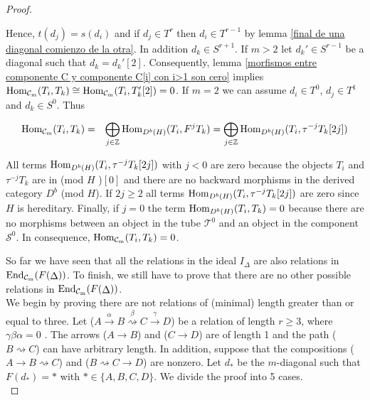 \documentclass{amsart}
\theoremstyle{plain}
\theoremstyle{definition}
\begin{document}
\begin{proof}
\begin{itemize}
      Hence,  $t(d_j)=s(d_i)$ and if $d_j\in T^r$ then $d_i\in T^{r-1}$ by lemma \ref{final de una diagonal comienzo de la otra}. In addition  $d_k\in S^{r+1}$.  If $m>2$ let $d_k'\in S^{r-1}$  be a diagonal such that  $d_k=d_k'[2]$. Consequently, lemma \ref{morfismos entre componente C y componente C[i] con i>1 son cero} implies ${\mathop{\rm Hom_{\mathcal{C}_m}}\nolimits}(T_i,T_k)\cong {\mathop{\rm Hom_{\mathcal{C}_m}}\nolimits}(T_i,T_k'[2])=0$. If $m=2$ we can assume $d_i\in T^0$, $d_j\in T^1$ and $d_k\in S^0$. Thus

      \begin{eqnarray*}
      {\mathop{\rm Hom_{\mathcal{C}_m}}\nolimits}(T_i,T_k) & =  &  \bigoplus_{j\in \mathbb{Z}} {\mathop{\rm Hom}\nolimits}_{D^b(H)}(T_i,F^jT_k)
       =  \bigoplus_{j\in \mathbb{Z}} {\mathop{\rm Hom}\nolimits}_{D^b(H)}(T_i,\tau^{-j}T_k[2j])
      \end{eqnarray*}

  All terms ${\mathop{\rm Hom}\nolimits}_{D^b(H)}(T_i,\tau^{-j}T_k[2j])$ with $j< 0$ are zero because the objects $T_i$ and  $\tau^{-j}T_k$ are in (mod $H$ )$[0]$ and there are no backward morphisms in the derived category $ D^b$ (mod $H$). If $2j\geq2$ all terms ${\mathop{\rm Hom}\nolimits}_{D^b(H)}(T_i,\tau^{-j}T_k[2j])$ are zero since $H$ is hereditary. Finally, if $j=0$ the term ${\mathop{\rm Hom}\nolimits}_{D^b(H)}(T_i,T_k)=0$ because there are no  morphisms between an  object in the tube $\mathcal{T}^0$ and an object in the component  $\mathcal{S}^0$. In consequence,  ${\mathop{\rm Hom_{\mathcal{C}_m}}\nolimits}(T_i,T_k) =0$.\\

\end{itemize}

So far we have seen that all the relations in the ideal  $I_{\Delta}$ are also relations in   ${\mathop{\rm End_{\mathcal{C}_m}}\nolimits}(F({\mathop{\Delta}\nolimits}))$.  To finish,  we still have to prove that there are no  other possible relations in   ${\mathop{\rm End_{\mathcal{C}_m}}\nolimits}(F({\mathop{\Delta}\nolimits}))$. \\

We begin by proving  there are not  relations of (minimal) length  greater than or equal to three. Let ($A\stackrel{\alpha}{\rightarrow} B \stackrel{\beta} {\rightsquigarrow} C\stackrel {\gamma}{\rightarrow} D$) be a relation  of length $r\geq 3$, where $\gamma\beta\alpha=0$ . The arrows
($A\rightarrow B$) and ($C\rightarrow D$) are of length 1 and the path
 ($B\rightsquigarrow C$) can have arbitrary length. In addition, suppose that the compositions
  ($A\rightarrow B \rightsquigarrow C $) and ($B \rightsquigarrow C \rightarrow D$) are nonzero. Let $d_*$  be the $m$-diagonal such that $F(d_*)=*$ with $*\in \{A,B,C,D\}$. We divide the proof into  5 cases.\\


\end{proof}
\end{document}
